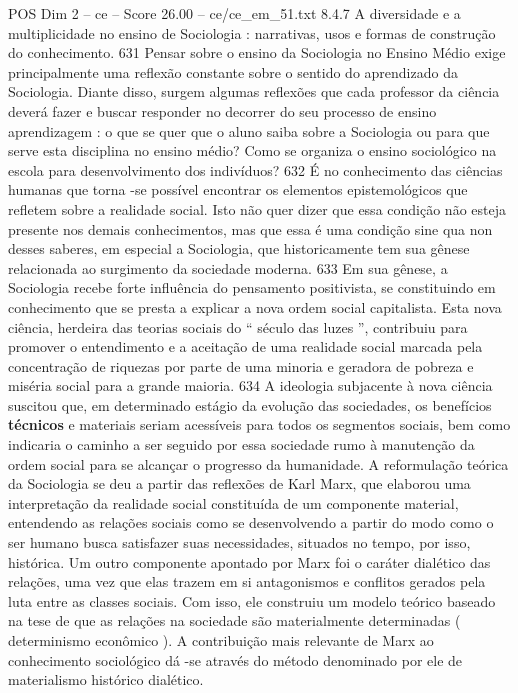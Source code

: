 \begin{textsample}{POS Dim 2 – ce – Score 26.00 – ce/ce\_em\_51.txt}  \label{ex:f2_pos_086}
8.4.7 A diversidade e a multiplicidade no ensino de Sociologia : narrativas, usos e formas de construção do conhecimento. 631 Pensar sobre o ensino da Sociologia no Ensino Médio exige principalmente uma reflexão constante sobre o sentido do aprendizado da Sociologia.
Diante disso, surgem algumas reflexões que cada professor da ciência deverá fazer e buscar responder no decorrer do seu processo de ensino aprendizagem : o que se quer que o aluno saiba sobre a Sociologia ou para que serve esta disciplina no ensino médio?
Como se organiza o ensino sociológico na escola para desenvolvimento dos indivíduos? 632 É no conhecimento das ciências humanas que torna -se possível encontrar os elementos epistemológicos que refletem sobre a realidade social.
Isto não quer dizer que essa condição não esteja presente nos demais conhecimentos, mas que essa é uma condição sine qua non desses saberes, em especial a Sociologia, que historicamente tem sua gênese relacionada ao surgimento da sociedade moderna. 633 Em sua gênese, a Sociologia recebe forte influência do pensamento positivista, se constituindo em conhecimento que se presta a explicar a nova ordem social capitalista.
Esta nova ciência, herdeira das teorias sociais do “ século das luzes ”, contribuiu para promover o entendimento e a aceitação de uma realidade social marcada pela concentração de riquezas por parte de uma minoria e geradora de pobreza e miséria social para a grande maioria. 634 A ideologia subjacente à nova ciência suscitou que, em determinado estágio da evolução das sociedades, os benefícios \textbf{técnicos} e materiais seriam acessíveis para todos os segmentos sociais, bem como indicaria o caminho a ser seguido por essa sociedade rumo à manutenção da ordem social para se alcançar o progresso da humanidade.
A reformulação teórica da Sociologia se deu a partir das reflexões de Karl Marx, que elaborou uma interpretação da realidade social constituída de um componente material, entendendo as relações sociais como se desenvolvendo a partir do modo como o ser humano busca satisfazer suas necessidades, situados no tempo, por isso, histórica.
Um outro componente apontado por Marx foi o caráter dialético das relações, uma vez que elas trazem em si antagonismos e conflitos gerados pela luta entre as classes sociais.
Com isso, ele construiu um modelo teórico baseado na tese de que as relações na sociedade são materialmente determinadas ( determinismo econômico ).
A contribuição mais relevante de Marx ao conhecimento sociológico dá -se através do método denominado por ele de materialismo histórico dialético.

\end{textsample}
